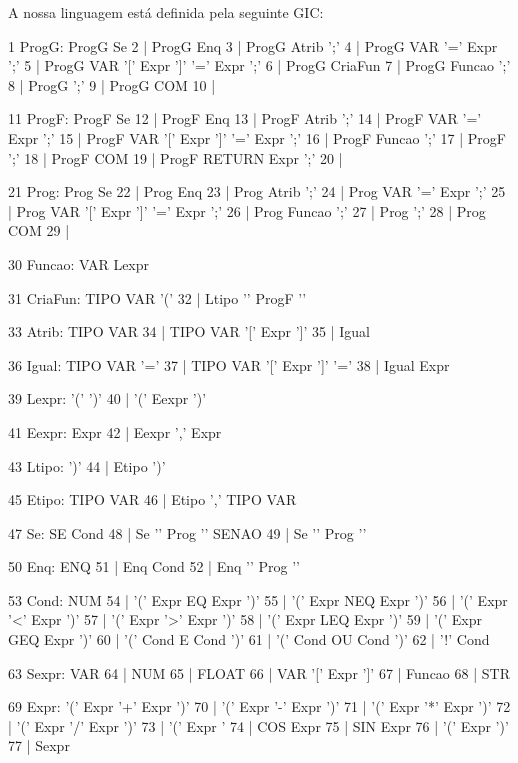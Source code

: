 \documentclass{report}
\begin{document}
\indent
A nossa linguagem está definida pela seguinte GIC:

\begin{code}
	
	1 ProgG: ProgG Se
	2      | ProgG Enq
	3      | ProgG Atrib ';'
	4      | ProgG VAR '=' Expr ';'
	5      | ProgG VAR '[' Expr ']' '=' Expr ';'
	6      | ProgG CriaFun
	7      | ProgG Funcao ';'
	8      | ProgG ';'
	9      | ProgG COM
	10     | %
	
	11 ProgF: ProgF Se
	12      | ProgF Enq
	13      | ProgF Atrib ';'
	14      | ProgF VAR '=' Expr ';'
	15      | ProgF VAR '[' Expr ']' '=' Expr ';'
	16      | ProgF Funcao ';'
	17      | ProgF ';'
	18      | ProgF COM
	19      | ProgF RETURN Expr ';'
	20      | %
	
	21 Prog: Prog Se
	22     | Prog Enq
	23     | Prog Atrib ';'
	24     | Prog VAR '=' Expr ';'
	25     | Prog VAR '[' Expr ']' '=' Expr ';'
	26     | Prog Funcao ';'
	27     | Prog ';'
	28     | Prog COM
	29     | %
	
	30 Funcao: VAR Lexpr
	
	31 CriaFun: TIPO VAR '('
	32        | Ltipo '{' ProgF '}'
	
	33 Atrib: TIPO VAR
	34      | TIPO VAR '[' Expr ']'
	35      | Igual
	
	36 Igual: TIPO VAR '='
	37      | TIPO VAR '[' Expr ']' '='
	38      | Igual Expr
	
	39 Lexpr: '(' ')'
	40      | '(' Eexpr ')'
	
	41 Eexpr: Expr
	42      | Eexpr ',' Expr
	
	43 Ltipo: ')'
	44      | Etipo ')'
	
	45 Etipo: TIPO VAR
	46      | Etipo ',' TIPO VAR
	
	47 Se: SE Cond
	48   | Se '{' Prog '}' SENAO
	49   | Se '{' Prog '}'
	
	50 Enq: ENQ
	51    | Enq Cond
	52    | Enq '{' Prog '}'
	
	53 Cond: NUM
	54     | '(' Expr EQ Expr ')'
	55     | '(' Expr NEQ Expr ')'
	56     | '(' Expr '<' Expr ')'
	57     | '(' Expr '>' Expr ')'
	58     | '(' Expr LEQ Expr ')'
	59     | '(' Expr GEQ Expr ')'
	60     | '(' Cond E Cond ')'
	61     | '(' Cond OU Cond ')'
	62     | '!' Cond
	
	63 Sexpr: VAR
	64      | NUM
	65      | FLOAT
	66      | VAR '[' Expr ']'
	67      | Funcao
	68      | STR
	
	69 Expr: '(' Expr '+' Expr ')'
	70     | '(' Expr '-' Expr ')'
	71     | '(' Expr '*' Expr ')'
	72     | '(' Expr '/' Expr ')'
	73     | '(' Expr '%
	74     | COS Expr
	75     | SIN Expr
	76     | '(' Expr ')'
	77     | Sexpr
	
\end{code}
\end{document}
